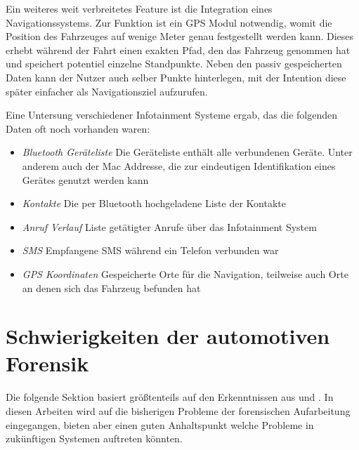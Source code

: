 \documentclass[conference,compsoc,final,a4paper]{IEEEtran}
\begin{document}
Ein weiteres weit verbreitetes Feature ist die Integration eines Navigationssystems.
Zur Funktion ist ein \ac{GPS} Modul notwendig, womit die Position des Fahrzeuges auf wenige Meter genau festgestellt werden kann.
Dieses erhebt während der Fahrt einen exakten Pfad, den das Fahrzeug genommen hat und speichert potentiel einzelne Standpunkte.
Neben den passiv gespeicherten Daten kann der Nutzer auch selber Punkte hinterlegen, mit der Intention diese später einfacher als 
Navigationsziel aufzurufen.

Eine Untersung verschiedener Infotainment Systeme ergab, das die folgenden Daten oft noch vorhanden waren:~\cite{Lacroix2017}
\begin{itemize}
  \item \emph{Bluetooth Geräteliste} Die Geräteliste enthält alle verbundenen Geräte. Unter anderem auch der Mac Addresse, die zur eindeutigen Identifikation eines Gerätes genutzt werden kann
  \item \emph{Kontakte} Die per Bluetooth hochgeladene Liste der Kontakte
  \item \emph{Anruf Verlauf} Liste getätigter Anrufe über das Infotainment System
  \item \emph{SMS} Empfangene SMS während ein Telefon verbunden war
  \item \emph{GPS Koordinaten} Gespeicherte Orte für die Navigation, teilweise auch Orte an denen sich das Fahrzeug befunden hat
\end{itemize}

\section{Schwierigkeiten der automotiven Forensik}

Die folgende Sektion basiert größtenteils auf den Erkenntnissen aus \cite{Kopencova_2020} und \cite{LeKhac2020}.
In diesen Arbeiten wird auf die bisherigen Probleme der forensischen Aufarbeitung eingegangen, bieten aber einen guten Anhaltspunkt
welche Probleme in zukünftigen Systemen auftreten könnten.\\
\end{document}
